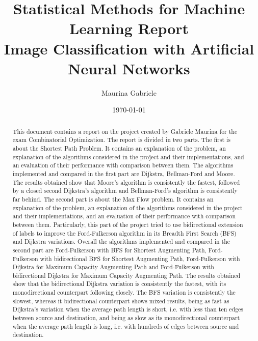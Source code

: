 \documentclass{article}
\title{Statistical Methods for Machine Learning Report\\[1ex]
\large Image Classification with Artificial Neural Networks}
\author{Maurina Gabriele}
\date{\today}
\begin{document}
\begin{titlepage}
\maketitle
\end{titlepage}

\begin{abstract}
This document contains a report on the project created by Gabriele Maurina for the exam Combinatorial Optimization.
The report is divided in two parts. The first is about the Shortest Path Problem. It contains an explanation of the problem,
an explanation of the algorithms considered in the project and their implementations, and an evaluation of their performance
with comparison between them. The algorithms implemented and compared in the first part are Dijkstra, Bellman-Ford and Moore.
The results obtained show that Moore's algorithm is consistently the fastest, followed by a closed second Dijkstra's algorithm
and Bellman-Ford's algorithm is consistently far behind.
The second part is about the Max Flow problem. It contains an explanation of the problem, an explanation of the algorithms considered in the project and
their implementations, and an evaluation of their performance with comparison between them. Particularly, this part of the project tried to
use bidirectional extension of labels to improve the Ford-Fulkerson algorithm in its Breadth First Search (BFS) and Dijkstra variations. Overall the algorithms implemented
and compared in the second part are Ford-Fulkerson with BFS for Shortest Augmenting Path, Ford-Fulkerson with bidirectional BFS for Shortest Augmenting Path,
Ford-Fulkerson with Dijkstra for Maximum Capacity Augmenting Path and Ford-Fulkerson with bidirectional Dijkstra for Maximum Capacity Augmenting Path.
The results obtained show that the bidirectional Dijkstra variation is consistently the fastest, with its monodirectional counterpart following closely.
The BFS variation is consistently the slowest, whereas it bidirectional counterpart shows mixed results, being as fast as Dijkstra's variation
when the average path length is short, i.e. with less than ten edges between source and destination, and being as slow as its monodirectional
counterpart when the average path length is long, i.e. with hundreds of edges between source and destination.
\end{abstract}

\tableofcontents



%
%
%
\end{document}
